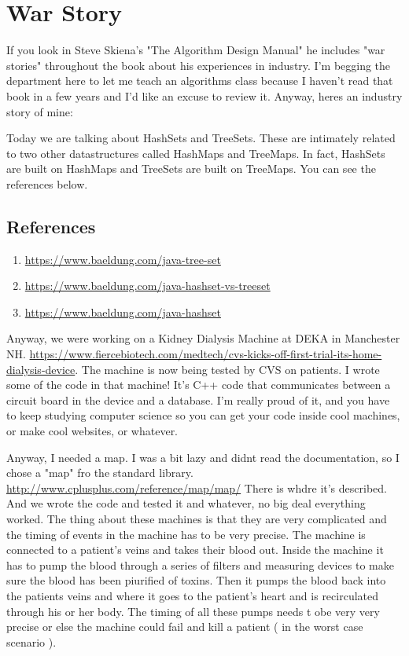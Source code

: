 \documentclass[12pt]{article}
\begin{document}
\section{War Story}
If you look in Steve Skiena's "The Algorithm Design Manual" he includes "war stories" throughout the book about his experiences in industry. I'm begging the department here to let me teach an algorithms class because I haven't read that book in a few years and I'd like an excuse to review it. Anyway, heres an industry story of mine:

Today we are talking about HashSets and TreeSets. These are intimately related to two other datastructures called HashMaps and TreeMaps. In fact, HashSets are built on HashMaps and TreeSets are built on TreeMaps. You can see the references below.

\subsection{References}
\begin{enumerate}
\item \url{https://www.baeldung.com/java-tree-set}
\item \url{https://www.baeldung.com/java-hashset-vs-treeset}
\item \url{https://www.baeldung.com/java-hashset}
\end{enumerate}

Anyway, we were working on a Kidney Dialysis Machine at DEKA in Manchester NH.
\url{https://www.fiercebiotech.com/medtech/cvs-kicks-off-first-trial-its-home-dialysis-device}. The machine is now being tested by CVS on patients. I wrote some of the code in that machine! It's C++ code that communicates between a circuit board in the device and a database. I'm really proud of it, and you have to keep studying computer science so you can get your code inside cool machines, or make cool websites, or whatever. 

Anyway, I needed a map. I was a bit lazy and didnt read the documentation, so I chose a "map" fro the standard library. \url{http://www.cplusplus.com/reference/map/map/} There is whdre it's described. And we wrote the code and tested it and whatever, no big deal everything worked. The thing about these machines is that they are very complicated and the timing of events in the machine has to be very precise. The machine is connected to a patient's veins and takes their blood out. Inside the machine it has to pump the blood through a series of filters and measuring devices to make sure the blood has been piurified of toxins. Then it pumps the blood back into the patients veins and where it goes to the patient's heart and is recirculated through his or her body. The timing of all these pumps needs t obe very very precise or else the machine could fail and kill a patient ( in the worst case scenario ).
\end{document}
